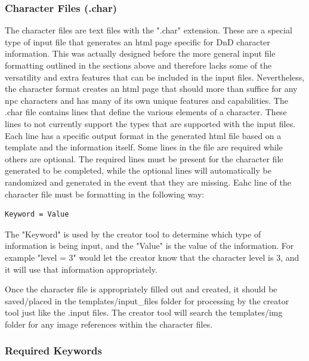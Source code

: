\subsubsection{Character Files (.char)}

The character files are text files with the ".char" extension. These are a special type of input file that generates an html page specific for DnD character information. This was actually designed before the more general input file formatting outlined in the sections above and therefore lacks some of the versatility and extra features that can be included in the input files. Nevertheless, the character format creates an html page that should more than suffice for any npc characters and has many of its own unique features and capabilities. The .char file contains lines that define the various elements of a character. These lines to not currently support the types that are supported with the input files. Each line has a specific output format in the generated html file based on a template and the information itself. Some lines in the file are required while others are optional. The required lines must be present for the character file generated to be completed, while the optional lines will automatically be randomized and generated in the event that they are missing. Eahc line of the character file must be formatting in the following way:
\begin{lstlisting}
Keyword = Value
\end{lstlisting}
The "Keyword" is used by the creator tool to determine which type of information is being input, and the "Value" is the value of the information. For example "level = 3" would let the creator know that the character level is 3, and it will use that information appropriately.

Once the character file is appropriately filled out and created, it should be saved/placed in the templates/input\_files folder for processing by the creator tool just like the .input files. The creator tool will search the templates/img folder for any image references within the character files.






\subsubsection{Required Keywords}

